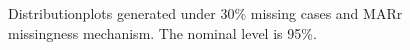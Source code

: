 \documentclass[12pt, fullpage, a4paper]{article}
\begin{document}
\begin{figure}
\begin{center}
{{			}
		}
	\end{center}
	\caption{Distributionplots generated under 30\% missing cases and MARr missingness mechanism. The nominal level is 95\%.}
	\label{fig7}
\end{figure}
\end{document}

